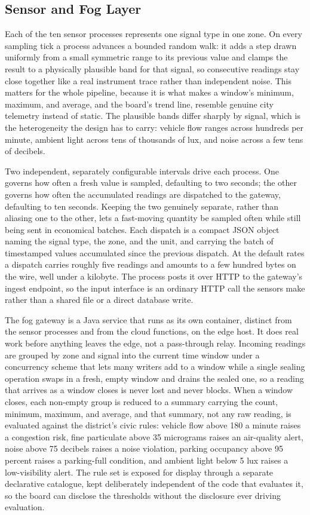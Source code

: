 \documentclass[conference]{IEEEtran}
\begin{document}
\subsection{Sensor and Fog Layer}

Each of the ten sensor processes represents one signal type in one zone. On every sampling tick a process advances a bounded random walk: it adds a step drawn uniformly from a small symmetric range to its previous value and clamps the result to a physically plausible band for that signal, so consecutive readings stay close together like a real instrument trace rather than independent noise. This matters for the whole pipeline, because it is what makes a window's minimum, maximum, and average, and the board's trend line, resemble genuine city telemetry instead of static. The plausible bands differ sharply by signal, which is the heterogeneity the design has to carry: vehicle flow ranges across hundreds per minute, ambient light across tens of thousands of lux, and noise across a few tens of decibels.

Two independent, separately configurable intervals drive each process. One governs how often a fresh value is sampled, defaulting to two seconds; the other governs how often the accumulated readings are dispatched to the gateway, defaulting to ten seconds. Keeping the two genuinely separate, rather than aliasing one to the other, lets a fast-moving quantity be sampled often while still being sent in economical batches. Each dispatch is a compact JSON object naming the signal type, the zone, and the unit, and carrying the batch of timestamped values accumulated since the previous dispatch. At the default rates a dispatch carries roughly five readings and amounts to a few hundred bytes on the wire, well under a kilobyte. The process posts it over HTTP to the gateway's ingest endpoint, so the input interface is an ordinary HTTP call the sensors make rather than a shared file or a direct database write.

The fog gateway is a Java service that runs as its own container, distinct from the sensor processes and from the cloud functions, on the edge host. It does real work before anything leaves the edge, not a pass-through relay. Incoming readings are grouped by zone and signal into the current time window under a concurrency scheme that lets many writers add to a window while a single sealing operation swaps in a fresh, empty window and drains the sealed one, so a reading that arrives as a window closes is never lost and never blocks. When a window closes, each non-empty group is reduced to a summary carrying the count, minimum, maximum, and average, and that summary, not any raw reading, is evaluated against the district's civic rules: vehicle flow above 180 a minute raises a congestion risk, fine particulate above 35 micrograms raises an air-quality alert, noise above 75 decibels raises a noise violation, parking occupancy above 95 percent raises a parking-full condition, and ambient light below 5 lux raises a low-visibility alert. The rule set is exposed for display through a separate declarative catalogue, kept deliberately independent of the code that evaluates it, so the board can disclose the thresholds without the disclosure ever driving evaluation.
\end{document}

